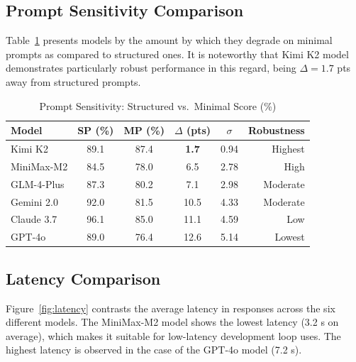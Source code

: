 \documentclass[conference]{IEEEtran}
\begin{document}
\subsection{Prompt Sensitivity Comparison}

Table~\ref{tab:sensitivity2} presents models by the amount by which they degrade on minimal prompts as compared to structured ones. It is noteworthy that Kimi K2 model demonstrates particularly robust performance in this regard, being $\Delta = 1.7$ pts away from structured prompts.

\begin{table}[H]
\centering
\caption{Prompt Sensitivity: Structured vs.\ Minimal Score (\%)}
\label{tab:sensitivity2}
\renewcommand{\arraystretch}{1.35}
\begin{tabular}{lccccr}
\toprule
\textbf{Model} & \textbf{SP (\%)} & \textbf{MP (\%)} & \textbf{$\Delta$ (pts)} & \textbf{$\sigma$} & \textbf{Robustness} \\
\midrule
Kimi K2     & 89.1 & 87.4 & \textbf{1.7}  & 0.94 & Highest \\
MiniMax-M2  & 84.5 & 78.0 & 6.5           & 2.78 & High \\
GLM-4-Plus  & 87.3 & 80.2 & 7.1           & 2.98 & Moderate \\
Gemini 2.0  & 92.0 & 81.5 & 10.5          & 4.33 & Moderate \\
Claude 3.7  & 96.1 & 85.0 & 11.1          & 4.59 & Low \\
GPT-4o      & 89.0 & 76.4 & 12.6          & 5.14 & Lowest \\
\bottomrule
\end{tabular}
\end{table}

\subsection{Latency Comparison}

Figure~\ref{fig:latency} contrasts the average latency in responses across the six different models. The MiniMax-M2 model shows the lowest latency (3.2 s on average), which makes it suitable for low-latency development loop uses. The highest latency is observed in the case of the GPT-4o model (7.2 s).
\end{document}
